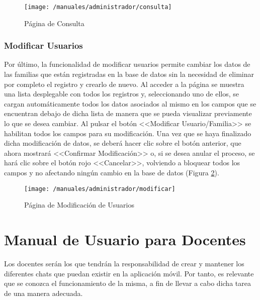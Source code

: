 \begin{figure}[!h]
	\begin{center}
		\texttt{[image: /manuales/administrador/consulta]}
		\caption{Página de Consulta}
		\label{fig:consultaweb}
	\end{center}
\end{figure}

\clearpage

\subsubsection*{Modificar Usuarios}
Por último, la funcionalidad de modificar usuarios permite cambiar los datos de las familias que están registradas en la base de datos sin la necesidad de eliminar por completo el registro y crearlo de nuevo. Al acceder a la página se muestra una lista desplegable con todos los registros y, seleccionando uno de ellos, se cargan automáticamente todos los datos asociados al mismo en los campos que se encuentran debajo de dicha lista de manera que se pueda visualizar previamente lo que se desea cambiar. Al pulsar el botón <<Modificar Usuario/Familia>> se habilitan todos los campos para su modificación. Una vez que se haya finalizado dicha modificación de datos, se deberá hacer clic sobre el botón anterior, que ahora mostrará <<Confirmar Modificación>> o, si se desea anular el proceso, se hará clic sobre el botón rojo <<Cancelar>>, volviendo a bloquear todos los campos y no afectando ningún cambio en la base de datos (Figura \ref{fig:modificaweb}).

\begin{figure}[!h]
	\begin{center}
		\texttt{[image: /manuales/administrador/modificar]}
		\caption{Página de Modificación de Usuarios}
		\label{fig:modificaweb}
	\end{center}
\end{figure}

\clearpage

\section*{Manual de Usuario para Docentes}
Los docentes serán los que tendrán la responsabilidad de crear y mantener los diferentes chats que puedan existir en la aplicación móvil. Por tanto, es relevante que se conozca el funcionamiento de la misma, a fin de llevar a cabo dicha tarea de una manera adecuada.


